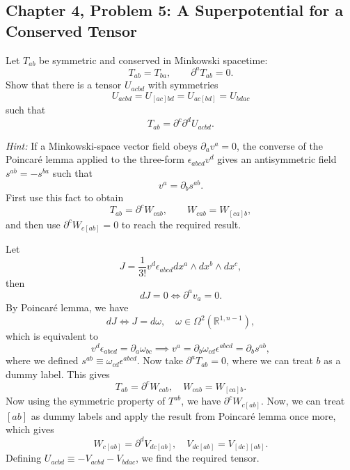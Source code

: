 \subsection{Chapter 4, Problem 5: A Superpotential for a Conserved Tensor}

Let $T_{ab}$ be symmetric and conserved in Minkowski spacetime:
\begin{equation}
    T_{ab}=T_{ba},
    \qquad
    \partial^aT_{ab}=0.
\end{equation}
Show that there is a tensor $U_{acbd}$ with symmetries
\begin{equation}
    U_{acbd}=U_{[ac]bd}=U_{ac[bd]}=U_{bdac}
\end{equation}
such that
\begin{equation}
    T_{ab}=\partial^c\partial^dU_{acbd}.
\end{equation}

\textit{Hint:} If a Minkowski-space vector field obeys $\partial_av^a=0$, the
converse of the Poincar\'e lemma applied to the three-form
$\epsilon_{abcd}v^d$ gives an antisymmetric field $s^{ab}=-s^{ba}$ such that
\begin{equation}
    v^a=\partial_bs^{ab}.
\end{equation}
First use this fact to obtain
\begin{equation}
    T_{ab}=\partial^cW_{cab},
    \qquad
    W_{cab}=W_{[ca]b},
\end{equation}
and then use $\partial^cW_{c[ab]}=0$ to reach the required result.
\begin{solution}
    Let
    \begin{equation}
        J = \frac{1}{3!}v^d\epsilon_{abcd}dx^a\wedge dx^b \wedge dx^c,
    \end{equation}
    then
    \begin{equation}
        dJ = 0 \iff \partial^a v_a = 0.
    \end{equation}
    By Poincaré lemma, we have
    \begin{equation}
        dJ \iff J = d\omega, \quad \omega \in \Omega^2(\mathbb{R}^{1,n-1}),
    \end{equation}
    which is equivalent to
    \begin{equation}
        v^d \epsilon_{abcd} = \partial_a \omega_{bc} \implies v^a = \partial_b\omega_{cd}\epsilon^{abcd} = \partial_b s^{ab},
    \end{equation}
    where we defined $s^{ab} \equiv\omega_{cd}\epsilon^{abcd} $. Now take $\partial^a T_{ab} = 0$, where we can treat $b$ as a dummy label. This gives
    \begin{equation}
        T_{ab} = \partial^c W_{cab}, \quad W_{cab} = W_{[ca]b}.
    \end{equation}
    Now using the symmetric property of $T^{ab}$, we have $\partial^c W_{c[ab]}$. Now, we can treat $[ab]$ as dummy labels and apply the result from Poincaré lemma once more, which gives
    \begin{equation}
        W_{c[ab]} = \partial^d V_{dc[ab]}, \quad V_{dc[ab]} = V_{[dc][ab]}.
    \end{equation}
    Defining $U_{acbd}\equiv-V_{acbd}-V_{bdac}$, we find the required tensor.
\end{solution}

